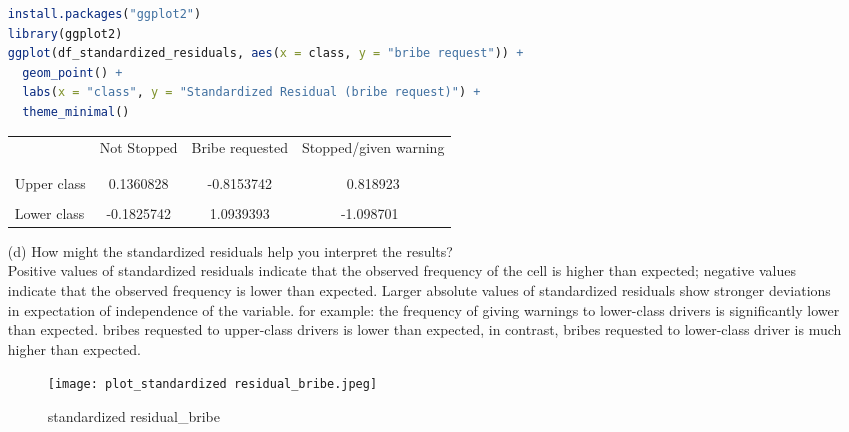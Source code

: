 \documentclass[12pt,letterpaper]{article}
\begin{document}
\begin{enumerate}
\begin{lstlisting}[language=R]
install.packages("ggplot2")
library(ggplot2)
ggplot(df_standardized_residuals, aes(x = class, y = "bribe request")) +
  geom_point() +
  labs(x = "class", y = "Standardized Residual (bribe request)") +
  theme_minimal()
 \end{lstlisting} 
	\begin{table}[h]
		\centering
		\begin{tabular}{l | c c c }
			& Not Stopped & Bribe requested & Stopped/given warning \\
			\\[-1.8ex] 
			\hline \\[-1.8ex]
			Upper class  &0.1360828 &-0.8153742 &0.818923\\
			\\
			Lower class &-0.1825742 &1.0939393 &-1.098701\
			
		\end{tabular}
	\end{table}
	
	
	\vspace{2cm}
	\item [(d)] How might the standardized residuals help you interpret the results?  
       \vspace{2cm}\\
       Positive values of standardized residuals indicate that the observed frequency of the cell is higher than expected; negative values indicate that the observed frequency is lower than expected. Larger absolute values of standardized residuals show stronger deviations in expectation of independence of the variable. for example: the frequency of giving warnings to lower-class drivers is significantly lower than expected. bribes requested to upper-class drivers is lower than expected, in contrast, bribes requested to lower-class driver is much higher than expected.
       \begin{figure}[htp]
    \centering
    \texttt{[image: plot\_standardized residual\_bribe.jpeg]}
    \caption { standardized residual_bribe }
    \label{plot:standardized residual_bribe}
\end{figure}

\end{enumerate}
\newpage
\end{document}
